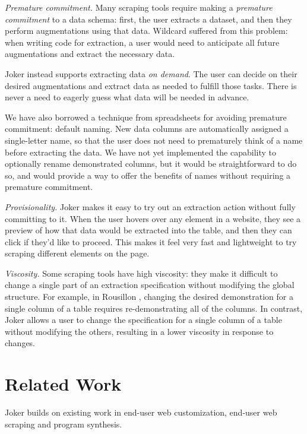 \documentclass[conference]{IEEEtran}
\begin{document}
\emph{Premature commitment.} Many scraping tools require making a
\emph{premature commitment} to a data schema: first, the user extracts a
dataset, and then they perform augmentations using that data. Wildcard
suffered from this problem: when writing code for extraction, a user
would need to anticipate all future augmentations and extract the
necessary data.

Joker instead supports extracting data \emph{on demand}. The user can
decide on their desired augmentations and extract data as needed to
fulfill those tasks. There is never a need to eagerly guess what data
will be needed in advance.

We have also borrowed a technique from spreadsheets for avoiding
premature commitment: default naming. New data columns are automatically
assigned a single-letter name, so that the user does not need to
prematurely think of a name before extracting the data. We have not yet
implemented the capability to optionally rename demonstrated columns,
but it would be straightforward to do so, and would provide a way to
offer the benefits of names without requiring a premature commitment.

\emph{Provisionality.} Joker makes it easy to try out an extraction
action without fully committing to it. When the user hovers over any
element in a website, they see a preview of how that data would be
extracted into the table, and then they can click if they'd like to
proceed. This makes it feel very fast and lightweight to try scraping
different elements on the page.

\emph{Viscosity.} Some scraping tools have high viscosity: they make it
difficult to change a single part of an extraction specification without
modifying the global structure. For example, in Rousillon
\citep{chasins2018}, changing the desired demonstration for a single
column of a table requires re-demonstrating all of the columns. In
contrast, Joker allows a user to change the specification for a single
column of a table without modifying the others, resulting in a lower
viscosity in response to changes.

\hypertarget{sec:related-work}{%
\section{Related Work}\label{sec:related-work}}

Joker builds on existing work in end-user web customization, end-user
web scraping and program synthesis.
\end{document}
